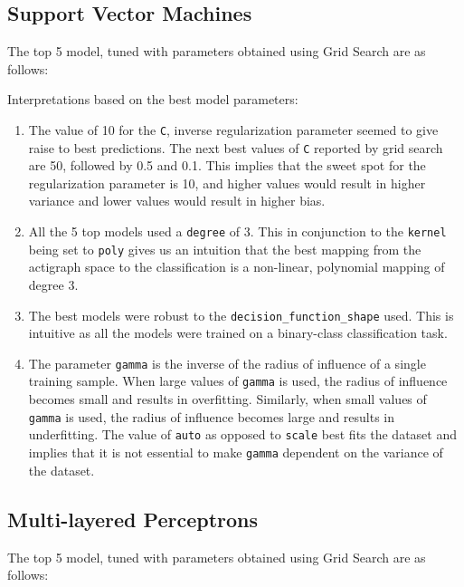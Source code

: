 \documentclass[11pt,a4paper]{article}
\newcommand{\noi}{\noindent}
\begin{document}
\subsection{Support Vector Machines}
The top 5 model, tuned with parameters obtained using Grid Search are as follows:


\noi
Interpretations based on the best model parameters:
\begin{enumerate}
	\itemsep0em
	\item The value of 10 for the \texttt{C}, inverse regularization parameter seemed to give raise to best predictions. The next best values of \texttt{C} reported by grid search are 50, followed by 0.5 and 0.1. This implies that the sweet spot for the regularization parameter is 10, and higher values would result in higher variance and lower values would result in higher bias.
	\item All the 5 top models used a \texttt{degree} of 3. This in conjunction to the \texttt{kernel} being set to \texttt{poly} gives us an intuition that the best mapping from the actigraph space to the classification is a non-linear, polynomial mapping of degree 3.
	\item The best models were robust to the \texttt{decision\_function\_shape} used. This is intuitive as all the models were trained on a binary-class classification task.
	\item The parameter \texttt{gamma} is the inverse of the radius of influence of a single training sample. When large values of \texttt{gamma} is used, the radius of influence becomes small and results in overfitting. Similarly, when small values of \texttt{gamma} is used, the radius of influence becomes large and results in underfitting. The value of \texttt{auto} as opposed to \texttt{scale} best fits the dataset and implies that it is not essential to make \texttt{gamma} dependent on the variance of the dataset.
\end{enumerate}

\subsection{Multi-layered Perceptrons}
The top 5 model, tuned with parameters obtained using Grid Search are as follows:

\end{document}
